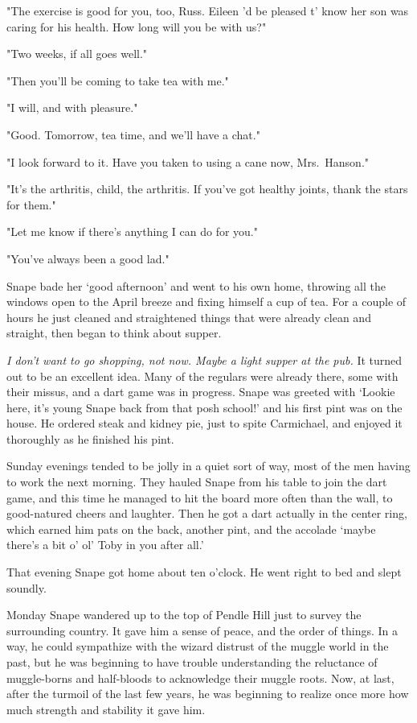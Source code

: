 "The exercise is good for you, too, Russ. Eileen 'd be pleased t' know her son was caring for his health. How long will you be with us?"

"Two weeks, if all goes well."

"Then you'll be coming to take tea with me."

"I will, and with pleasure."

"Good. Tomorrow, tea time, and we'll have a chat."

"I look forward to it. Have you taken to using a cane now, Mrs.~Hanson."

"It's the arthritis, child, the arthritis. If you've got healthy joints, thank the stars for them."

"Let me know if there's anything I can do for you."

"You've always been a good lad."

Snape bade her `good afternoon' and went to his own home, throwing all the windows open to the April breeze and fixing himself a cup of tea. For a couple of hours he just cleaned and straightened things that were already clean and straight, then began to think about supper.

\emph{I don't want to go shopping, not now. Maybe a light supper at the pub.} It turned out to be an excellent idea. Many of the regulars were already there, some with their missus, and a dart game was in progress. Snape was greeted with `Lookie here, it's young Snape back from that posh school!' and his first pint was on the house. He ordered steak and kidney pie, just to spite Carmichael, and enjoyed it thoroughly as he finished his pint.

Sunday evenings tended to be jolly in a quiet sort of way, most of the men having to work the next morning. They hauled Snape from his table to join the dart game, and this time he managed to hit the board more often than the wall, to good-natured cheers and laughter. Then he got a dart actually in the center ring, which earned him pats on the back, another pint, and the accolade `maybe there's a bit o' ol' Toby in you after all.'

That evening Snape got home about ten o'clock. He went right to bed and slept soundly.

Monday Snape wandered up to the top of Pendle Hill just to survey the surrounding country. It gave him a sense of peace, and the order of things. In a way, he could sympathize with the wizard distrust of the muggle world in the past, but he was beginning to have trouble understanding the reluctance of muggle-borns and half-bloods to acknowledge their muggle roots. Now, at last, after the turmoil of the last few years, he was beginning to realize once more how much strength and stability it gave him.

